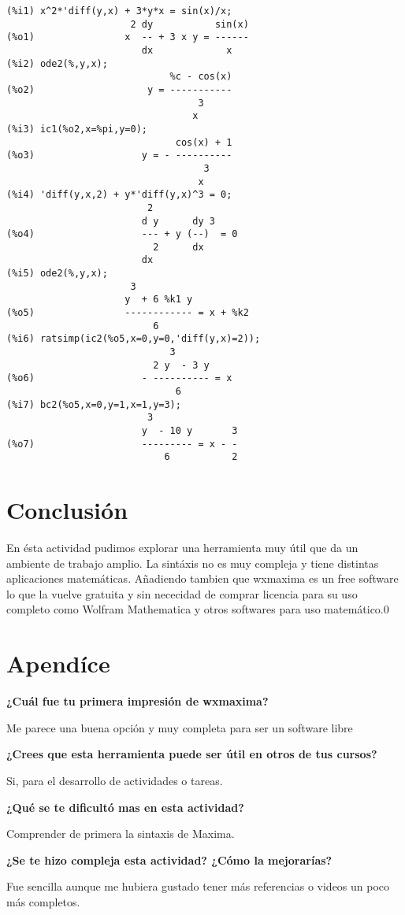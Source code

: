 \documentclass[12pt]{article}
\begin{document}
\begin{verbatim}
(%i1) x^2*'diff(y,x) + 3*y*x = sin(x)/x;
                      2 dy           sin(x)
(%o1)                x  -- + 3 x y = ------
                        dx             x
(%i2) ode2(%,y,x);
                             %c - cos(x)
(%o2)                    y = -----------
                                  3
                                 x
(%i3) ic1(%o2,x=%pi,y=0);
                              cos(x) + 1
(%o3)                   y = - ----------
                                   3
                                  x
(%i4) 'diff(y,x,2) + y*'diff(y,x)^3 = 0;
                         2
                        d y      dy 3
(%o4)                   --- + y (--)  = 0
                          2      dx
                        dx
(%i5) ode2(%,y,x);
                      3
                     y  + 6 %k1 y
(%o5)                ------------ = x + %k2
                          6
(%i6) ratsimp(ic2(%o5,x=0,y=0,'diff(y,x)=2));
                             3
                          2 y  - 3 y
(%o6)                   - ---------- = x
                              6
(%i7) bc2(%o5,x=0,y=1,x=1,y=3);
                         3
                        y  - 10 y       3
(%o7)                   --------- = x - -
                            6           2
\end{verbatim}

\section{Conclusión}

En ésta actividad pudimos explorar una herramienta muy útil que da un ambiente de trabajo amplio. La sintáxis no es muy compleja y tiene distintas aplicaciones matemáticas. Añadiendo tambien que wxmaxima es un free software lo que la vuelve gratuita y sin nececidad de comprar licencia para su uso completo como Wolfram Mathematica y otros softwares para uso matemático.0

\section{Apendíce}

\textbf{¿Cuál fue tu primera impresión de wxmaxima?}

Me parece una buena opción y muy completa para ser un software libre

\textbf{¿Crees que esta herramienta puede ser útil en otros de tus cursos?}

Si, para el desarrollo de actividades o tareas.

\textbf{¿Qué se te dificultó mas en esta actividad?}

Comprender de primera la sintaxis de Maxima.

\textbf{¿Se te hizo compleja esta actividad? ¿Cómo la mejorarías? }

Fue sencilla aunque me hubiera gustado tener más referencias o videos un poco más completos.
\end{document}
